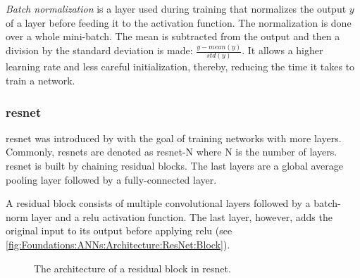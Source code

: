 \emph{Batch normalization} \cite{ioffe2015batch} is a layer used during training that normalizes the output $y$ of a layer before feeding it to the activation function. The normalization is done over a whole mini-batch. The mean is subtracted from the output and then a division by the standard deviation is made: $\frac{y - mean(y)}{std(y)}$. It allows a higher learning rate and less careful initialization, thereby, reducing the time it takes to train a network.


\subsubsection{\acs{resnet}}
\label{sec:Foundations:NeuralNetworks:Architecture:ResNet}

\Ac{resnet} was introduced by \textcite{he2016deep} with the goal of training networks with more layers. Commonly, \acp{resnet} are denoted as \acs{resnet}-N where N is the number of layers. \Ac{resnet} is built by chaining residual blocks. The last layers are a global average pooling layer followed by a fully-connected layer.

A residual block consists of multiple convolutional layers followed by a \ac{batch-norm} layer and a \ac{relu} activation function. The last layer, however, adds the original input to its output before applying \ac{relu} (see \autoref{fig:Foundations:ANNs:Architecture:ResNet:Block}).

\begin{figure}
    \centering
    \caption{The architecture of a residual block in \acs*{resnet}.}
    \label{fig:Foundations:ANNs:Architecture:ResNet:Block}
\end{figure}


